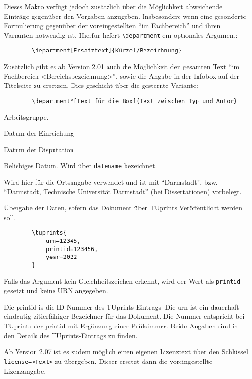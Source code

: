 \documentclass[
	german,%
	ruledheaders=chapter,%
	class=book,%
	thesis={%
			type=dr,
			dr=rernat
		},
	fontsize=11pt,%
	parskip=half-,%
	custommargins=true,%
	marginpar=false,%
	accentcolor=9c,%
]{tudapub}
\let\code\texttt
\begin{document}
\begin{description}
	      Dieses Makro verfügt jedoch zusätzlich über die Möglichkeit abweichende Einträge gegenüber den Vorgaben anzugeben. Insbesondere wenn eine gesonderte Formulierung gegenüber der voreingestellten \enquote{im Fachbereich} und ihren Varianten notwendig ist. Hierfür liefert \code{\textbackslash{}department} ein optionales Argument:

\begin{verbatim}
        \department[Ersatztext]{Kürzel/Bezeichnung}
\end{verbatim}
	      Zusätzlich gibt es ab Version 2.01 auch die Möglichkeit den gesamten Text \enquote{im Fachbereich <Bereichsbezeichnung>}, sowie die Angabe in der Infobox auf der Titelseite zu ersetzen. Dies geschieht über die gesternte Variante:
\begin{verbatim}
        \department*[Text für die Box]{Text zwischen Typ und Autor}
\end{verbatim}
	\item[group] Arbeitsgruppe.
	\item[submissiondate] Datum der Einreichung
	\item[examdate] Datum der Disputation
	\item[date] Beliebiges Datum. Wird über \verb|datename| bezeichnet.
	\item[publishers] Wird hier für die Ortsangabe verwendet und ist mit \enquote{Darmstadt}, bzw. \enquote{Darmstadt, Technische Universität Darmstadt} (bei Dissertationen) vorbelegt.
	\item[tuprints] \label{page:tuprints}Übergabe der Daten, sofern das Dokument über TUprints Veröffentlicht werden soll.
\begin{verbatim}
        \tuprints{
            urn=12345,
            printid=123456,
            year=2022
        }
\end{verbatim}
	      Falls das Argument kein Gleichheitszeichen erkennt, wird der Wert als \code{printid} gesetzt und keine URN angegeben.

	      Die printid is die ID-Nummer des TUprints-Eintrags. Die urn ist ein dauerhaft eindeutig zitierfähiger Bezeichner für das Dokument. Die Nummer entspricht bei TUprints der printid mit Ergänzung einer Prüfzimmer. Beide Angaben sind in den Details des TUprints-Eintrags zu finden.

	      Ab Version 2.07 ist es zudem möglich einen eigenen Lizenztext über den Schlüssel \verb|license=<Text>| zu übergeben. Dieser ersetzt dann die voreingestellte Lizenzangabe.


\end{description}
\end{document}
